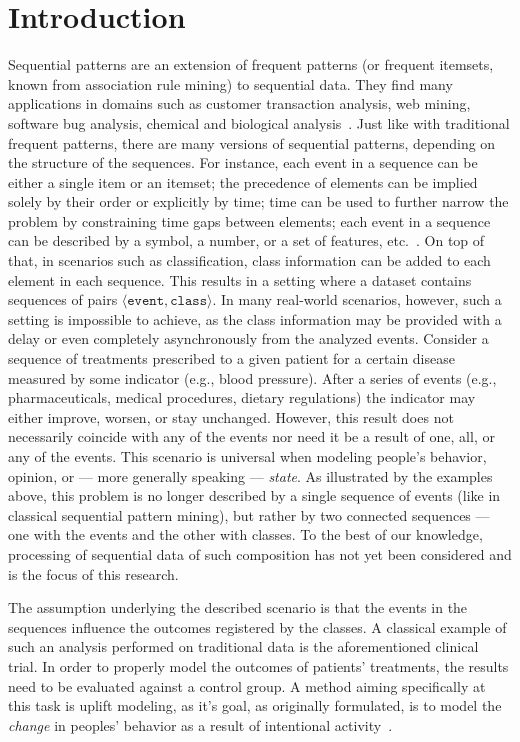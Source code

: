 \documentclass[runningheads,a4paper]{llncs}
\begin{document}
\section{Introduction}
\label{sec:introduction}

Sequential patterns are an extension of frequent patterns (or frequent itemsets, known from association rule mining) to sequential data.
They find many applications in domains such as customer transaction analysis, web mining, software bug analysis, chemical and biological analysis~\cite{Aggarwal:2014}.
Just like with traditional frequent patterns, there are many versions of sequential patterns, depending on the structure of the sequences.
For instance, each event in a sequence can be either a single item or an itemset; the precedence of elements can be implied solely by their order or explicitly by time; time can be used to further narrow the problem by constraining time gaps between elements; each event in a sequence can be described by a symbol, a number, or a set of features, etc.~\cite{Dong:2009}.
On top of that, in scenarios such as classification, class information can be added to each element in each sequence.
This results in a setting where a dataset contains sequences of pairs $\langle\texttt{event}, \texttt{class}\rangle$.
In many real-world scenarios, however, such a setting is impossible to achieve, as the class information may be provided with a delay or even completely asynchronously from the analyzed events.
Consider a sequence of treatments prescribed to a given patient for a certain disease measured by some indicator (e.g., blood pressure).
After a series of events (e.g., pharmaceuticals, medical procedures, dietary regulations) the indicator may either improve, worsen, or stay unchanged.
However, this result does not necessarily coincide with any of the events nor need it be a result of one, all, or any of the events.
This scenario is universal when modeling people's behavior, opinion, or --- more generally speaking --- \textit{state}.
As illustrated by the examples above, this problem is no longer described by a single sequence of events (like in classical sequential pattern mining), but rather by two connected sequences --- one with the events and the other with classes.
To the best of our knowledge, processing of sequential data of such composition has not yet been considered and is the focus of this research.

The assumption underlying the described scenario is that the events in the sequences influence the outcomes registered by the classes.
A classical example of such an analysis performed on traditional data is the aforementioned clinical trial.
In order to properly model the outcomes of patients' treatments, the results need to be evaluated against a control group.
A method aiming specifically at this task is uplift modeling, as it's goal, as originally formulated, is to model the \textit{change} in peoples' behavior as a result of intentional activity~\cite{Radcliffe:1999}.
\end{document}
